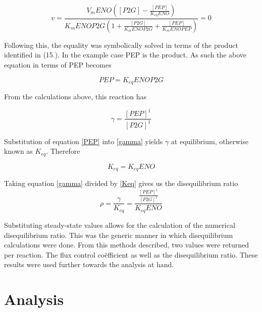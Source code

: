 \begin{equation}
v = \frac{V_mENO([P2G] - \frac{[PEP]}{K_{eq}ENO})}{K_mENOP2G(1 + \frac{[P2G]}{K_mENOP2G} + \frac{[PEP]}{K_mENOPEP})} = 0
\end{equation}

Following this, the equality was symbolically solved in terms of the product identified in (15.). In the example case PEP is the product. As such the above equation in terms of PEP becomes

\begin{equation}\label{PEP}
PEP = K_{eq}ENOP2G
\end{equation}

From the calculations above, this reaction has

\begin{equation}\label{gamma}
\gamma=\frac{[PEP]^1}{[P2G]^1}
\end{equation}

Substitution of equation \ref{PEP} into \ref{gamma} yields $\gamma$ at equilibrium, otherwise known as $K_{eq}$. Therefore

\begin{equation}\label{Keq}
K_{eq}=K_{eq}ENO
\end{equation}

Taking equation \ref{gamma} divided by \ref{Keq} gives us the disequilibrium ratio
\begin{equation}
\rho = \frac{\gamma}{K_{eq}} = \frac{\frac{[PEP]^1}{[P2G]^1}}{K_{eq}ENO}
\end{equation}

Substituting steady-state values allows for the calculation of the numerical disequilibrium ratio. This was the generic manner in which disequilibrium calculations were done. From this methods described, two values were returned per reaction. The flux control co\"efficient as well as the disequilibrium ratio. These results were used further towards the analysis at hand.

\section{Analysis} \label{Analysis}
